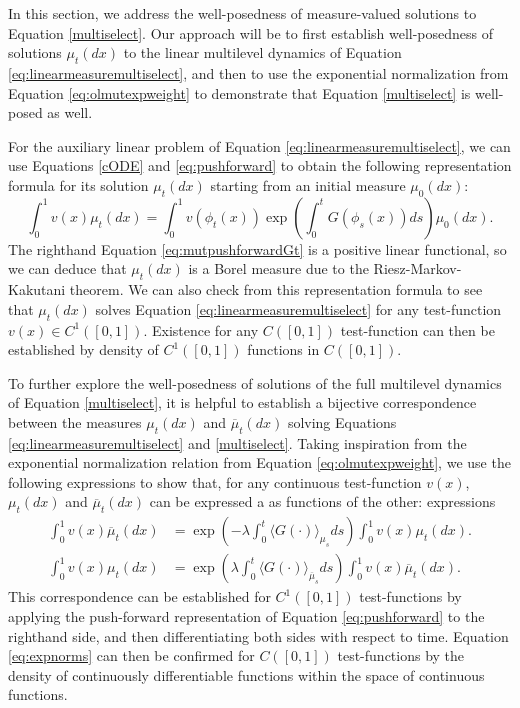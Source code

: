 \documentclass[11pt]{article}
\numberwithin{equation}{section}
\newcommand{\ol}{\overline}
\begin{document}
{In this section, we address the well-posedness of measure-valued solutions to Equation \eqref{multiselect}.  Our approach will be to first establish well-posedness of solutions $\mu_t(dx)$ to the linear multilevel dynamics of Equation \eqref{eq:linearmeasuremultiselect}, and then to use the exponential normalization from Equation \eqref{eq:olmutexpweight} to demonstrate that Equation \eqref{multiselect} is well-posed as well. 

For the auxiliary linear problem of Equation \eqref{eq:linearmeasuremultiselect}, we can use Equations \eqref{cODE} and \eqref{eq:pushforward} to obtain the following representation formula for its solution $\mu_t(dx)$ starting from an initial measure $\mu_0(dx)$:
\begin{equation} \label{eq:mutpushforwardGt}
    \int_0^1 v(x) \mu_t(dx) = \int_0^1 v(\phi_t(x)) \exp\left( \int_0^t G(\phi_s(x)) ds \right) \mu_0(dx). 
\end{equation}
The righthand Equation \eqref{eq:mutpushforwardGt} is a positive linear functional, so we can deduce that $\mu_t(dx)$ is a Borel measure due to the Riesz-Markov-Kakutani theorem. We can also check from this representation formula to see that $\mu_t(dx)$ solves Equation \eqref{eq:linearmeasuremultiselect} for any test-function $v(x) \in C^1([0,1])$. Existence for any $C([0,1])$ test-function can then be established by density of $C^1([0,1])$ functions in $C([0,1])$. 

To further explore the well-posedness of solutions of the full multilevel dynamics of Equation \eqref{multiselect}, it is helpful to establish a bijective correspondence between the measures $\mu_t(dx)$ and $\ol{\mu}_t(dx)$ solving Equations \eqref{eq:linearmeasuremultiselect} and \eqref{multiselect}. Taking inspiration from the exponential normalization relation from Equation \eqref{eq:olmutexpweight}, we use the following expressions to show that, for any continuous test-function $v(x)$, $\mu_t(dx)$ and $\ol{\mu}_t(dx)$ can be expressed a as functions of the other: expressions
\begin{subequations} \label{eq:expnorms}
\begin{align} 
    \int_0^1 v(x) \ol{\mu}_t(dx) &=  \exp\left(- \lambda \int_0^t \langle G(\cdot) \rangle_{\mu_s} ds  \right) \int_0^1 v(x)  \mu_t(dx). \label{eq:olmutexpweight2}\\
      \int_0^1 v(x)  \mu_t(dx) &= \exp\left( \lambda \int_0^t \langle G(\cdot) \rangle_{\ol{\mu}_s} ds  \right) \int_0^1 v(x)  \ol{\mu}_t(dx). \label{eq:mutexpweight}
\end{align}
\end{subequations}
This correspondence can be established for $C^1([0,1])$ test-functions by applying the push-forward representation of Equation \eqref{eq:pushforward} to the righthand side, and then differentiating both sides with respect to time. Equation \eqref{eq:expnorms} can then be confirmed for $C([0,1])$ test-functions by the density of continuously differentiable functions within the space of continuous functions.

}
\end{document}
